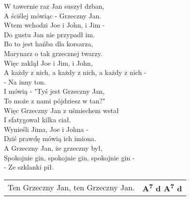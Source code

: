 W tawernie raz Jan suszył dzban, \\
A ściślej mówiąc - Grzeczny Jan. \\
Wtem wchodzi Joe i John, i Jim - \\
Do gustu Jan nie przypadł im. \\
Bo to jest hańba dla korsarza, \\
Marynarz o tak grzecznej twarzy. \\
Więc zaklął Joe i Jim, i John, \\
A każdy z nich, a każdy z nich, a każdy z nich - \\
- Na inny ton. \\

I mówią - "Tyś jest Grzeczny Jan, \\
To może z nami pójdziesz w tan?" \\
Więc Grzeczny Jan z uśmiechem wstał \\
I sfatygował kilka ciał. \\
Wynieśli Jima, Joe i Johna - \\
Dziś prawdę mówią ich imiona. \\
A Grzeczny Jan, że grzeczny był, \\
Spokojnie gin, spokojnie gin, spokojnie gin - \\
- Ze szklanki pił. \\

\vspace{2em}
\begin{tabular}{@{}p{9cm}@{}l@{}}
Ten Grzeczny Jan, ten Grzeczny Jan.  & \bfseries   A\textsuperscript{7} d A\textsuperscript{7} d \\
\end{tabular}